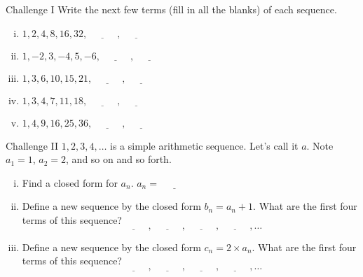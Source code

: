 \documentclass[12pt,letterpaper]{article}
\begin{document}
\begin{problem}{Challenge I}
 Write the next few terms (fill in all the blanks) of each sequence.

 \begin{enumerate}[i.]
  \item $1, 2, 4, 8, 16, 32,
  \underline{\hspace{3em}}, \underline{\hspace{3em}}$
  \item $1, -2, 3, -4, 5, -6,
  \underline{\hspace{3em}}, \underline{\hspace{3em}}$
  \item $1, 3, 6, 10, 15, 21,
  \underline{\hspace{3em}}, \underline{\hspace{3em}}$
  \item $1, 3, 4, 7, 11, 18,
  \underline{\hspace{3em}}, \underline{\hspace{3em}}$
  \item $1, 4, 9, 16, 25, 36,
  \underline{\hspace{3em}}, \underline{\hspace{3em}}$
 \end{enumerate}
\end{problem}

\begin{problem}{Challenge II}
 $1, 2, 3, 4, \dots$ is a simple arithmetic sequence. Let's call it $a$.
 Note $a_1=1$, $a_2=2$, and so on and so forth.

 \begin{enumerate}[i.]
  \item Find a closed form for $a_n$. \hfill $a_n = \underline{\hspace{3em}}$
  \item Define a new sequence by the closed form $b_n = a_n + 1$.
  What are the first four terms of this sequence?
  \[
   \underline{\hspace{3em}}, \underline{\hspace{3em}}, \underline{\hspace{3em}},
   \underline{\hspace{3em}}, \dots
  \]
  \item Define a new sequence by the closed form $c_n = 2\times a_n$.
  What are the first four terms of this sequence?
  \[
   \underline{\hspace{3em}}, \underline{\hspace{3em}}, \underline{\hspace{3em}},
   \underline{\hspace{3em}}, \dots
  \]
 \end{enumerate}
\end{problem}
\end{document}
